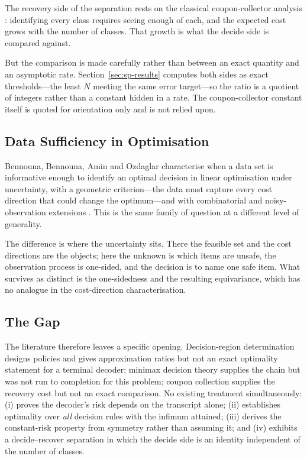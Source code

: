 The recovery side of the separation rests on the classical coupon-collector analysis
\cite{motwani1995}: identifying every class requires seeing enough of each, and the expected
cost grows with the number of classes. That growth is what the decide side is compared
against.

But the comparison is made carefully rather than between an exact quantity and an asymptotic
rate. Section~\ref{sec:sp-results} computes both sides as exact thresholds---the least $N$
meeting the same error target---so the ratio is a quotient of integers rather than a constant
hidden in a rate. The coupon-collector constant itself is quoted for orientation only and is
not relied upon.

\subsection{Data Sufficiency in Optimisation}

Bennouna, Bennouna, Amin and Ozdaglar characterise when a data set is informative enough to
identify an optimal decision in linear optimisation under uncertainty, with a geometric
criterion---the data must capture every cost direction that could change the optimum---and
with combinatorial and noisy-observation extensions \cite{bennouna2026}. This is the same
family of question at a different level of generality.

The difference is where the uncertainty sits. There the feasible set and the cost directions
are the objects; here the unknown is which items are unsafe, the observation process is
one-sided, and the decision is to name one safe item. What survives as distinct is the
one-sidedness and the resulting equivariance, which has no analogue in the cost-direction
characterisation.

\subsection{The Gap}

The literature therefore leaves a specific opening. Decision-region determination designs
policies and gives approximation ratios but not an exact optimality statement for a terminal
decoder; minimax decision theory supplies the chain but was not run to completion for this
problem; coupon collection supplies the recovery cost but not an exact comparison. No existing
treatment simultaneously: (i) proves the decoder's risk depends on the transcript alone;
(ii) establishes optimality over \emph{all} decision rules with the infimum attained;
(iii) derives the constant-risk property from symmetry rather than assuming it; and
(iv) exhibits a decide--recover separation in which the decide side is an identity independent
of the number of classes.


